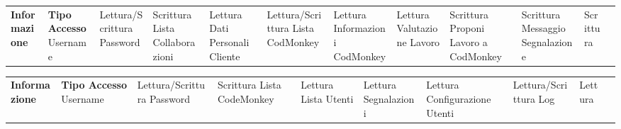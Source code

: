 \begin{center}
\begin{tabularx}
        \n
    \end{tabularx}\label{tab:monkeytable:problema:tabellaRuoloInformazioni:Codmonkey}


    \phantom{M}%


    \begin{tabularx}
        {\textwidth} {|X|X|}
        \hline  {}
        \n      {}
        \large \textbf{Informazione}       & \centering\large\textbf{Tipo Accesso}
        \n      Username                   & Lettura/Scrittura
        \n      Password                   & Scrittura
        \n      Lista Collaborazioni       & Lettura
        \n      Dati Personali Cliente     & Lettura/Scrittura
        \n      Lista CodMonkey            & Lettura
        \n      Informazioni CodMonkey     & Lettura
        \n      Valutazione Lavoro         & Scrittura
        \n      Proponi Lavoro a CodMonkey & Scrittura
        \n      Messaggio Segnalazione     & Scrittura
        \n
    \end{tabularx}\label{tab:monkeytable:problema:tabellaRuoloInformazioni:Cliente}


    \phantom{M}%


    \begin{tabularx}
        {\textwidth} {|X|X|}
        \hline  {}
        \n      {}
        \large \textbf{Informazione}  & \centering\large\textbf{Tipo Accesso}
        \n      Username              & Lettura/Scrittura
        \n      Password              & Scrittura
        \n      Lista CodeMonkey      & Lettura
        \n      Lista Utenti          & Lettura
        \n      Segnalazioni          & Lettura
        \n      Configurazione Utenti & Lettura/Scrittura
        \n      Log                   & Lettura
        \n
    \end{tabularx}\label{tab:monkeytable:problema:tabellaRuoloInformazioni:Amministratore}


\end{center}

